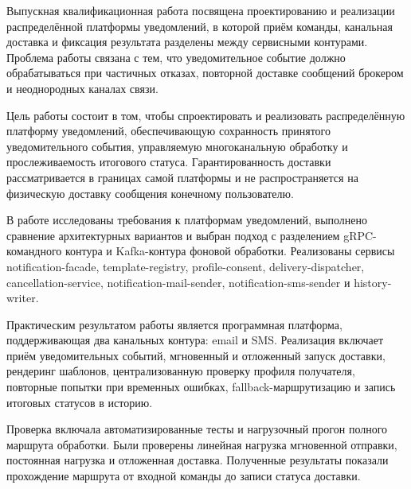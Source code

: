 \abstract


Выпускная квалификационная работа посвящена проектированию и реализации распределённой платформы уведомлений, в которой приём команды, канальная доставка и фиксация результата разделены между сервисными контурами. Проблема работы связана с тем, что уведомительное событие должно обрабатываться при частичных отказах, повторной доставке сообщений брокером и неоднородных каналах связи.

Цель работы состоит в том, чтобы спроектировать и реализовать распределённую платформу уведомлений, обеспечивающую сохранность принятого уведомительного события, управляемую многоканальную обработку и прослеживаемость итогового статуса. Гарантированность доставки рассматривается в границах самой платформы и не распространяется на физическую доставку сообщения конечному пользователю.

В работе исследованы требования к платформам уведомлений, выполнено сравнение архитектурных вариантов и выбран подход с разделением gRPC-командного контура и Kafka-контура фоновой обработки. Реализованы сервисы notification-facade, template-registry, profile-consent, delivery-dispatcher, cancellation-service, notification-mail-sender, notification-sms-sender и history-writer.

Практическим результатом работы является программная платформа, поддерживающая два канальных контура: email и SMS. Реализация включает приём уведомительных событий, мгновенный и отложенный запуск доставки, рендеринг шаблонов, централизованную проверку профиля получателя, повторные попытки при временных ошибках, fallback-маршрутизацию и запись итоговых статусов в историю.

Проверка включала автоматизированные тесты и нагрузочный прогон полного маршрута обработки. Были проверены линейная нагрузка мгновенной отправки, постоянная нагрузка и отложенная доставка. Полученные результаты показали прохождение маршрута от входной команды до записи статуса доставки.
